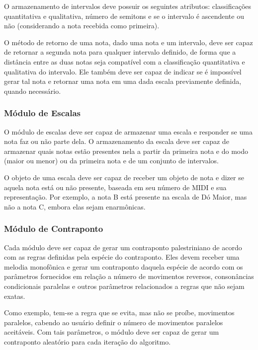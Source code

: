       O armazenamento de intervalos deve possuir os seguintes atributos: classificações quantitativa e qualitativa, número de semitons e se o intervalo é ascendente ou não (considerando a nota recebida como primeira).

      O método de retorno de uma nota, dado uma nota e um intervalo, deve ser capaz de retornar a segunda nota para qualquer intervalo definido, de forma que a distância entre as duas notas seja compatível com a classificação quantitativa e qualitativa do intervalo. Ele também deve ser capaz de indicar se é impossível gerar tal nota e retornar uma nota em uma dada escala previamente definida, quando necessário.

    \subsubsection[Módulo de Escalas]{Módulo de Escalas}

      O módulo de escalas deve ser capaz de armazenar uma escala e responder se uma nota faz ou não parte dela. O armazenamento da escala deve ser capaz de armazenar quais notas estão presentes nela a partir da primeira nota e do modo (maior ou menor) ou da primeira nota e de um conjunto de intervalos.

      O objeto de uma escala deve ser capaz de receber um objeto de nota e dizer se aquela nota está ou não presente, baseada em seu número de MIDI e sua representação. Por exemplo, a nota B está presente na escala de Dó Maior, mas não a nota C\fl{}, embora elas sejam enarmônicas.

    \subsubsection[Módulos de Contraponto]{Módulo de Contraponto}

      Cada módulo deve ser capaz de gerar um contraponto palestriniano de acordo com as regras definidas pela espécie do contraponto. Eles devem receber uma melodia monofônica e gerar um contraponto daquela espécie de acordo com os parâmetros fornecidos em relação a número de movimentos reversos, consonâncias condicionais paralelas e outros parâmetros relacionados a regras que não sejam exatas.

      Como exemplo, tem-se a regra que se evita, mas não se proíbe, movimentos paralelos, cabendo ao usuário definir o número de movimentos paralelos aceitáveis. Com tais parâmetros, o módulo deve ser capaz de gerar um contraponto aleatório para cada iteração do algoritmo.

